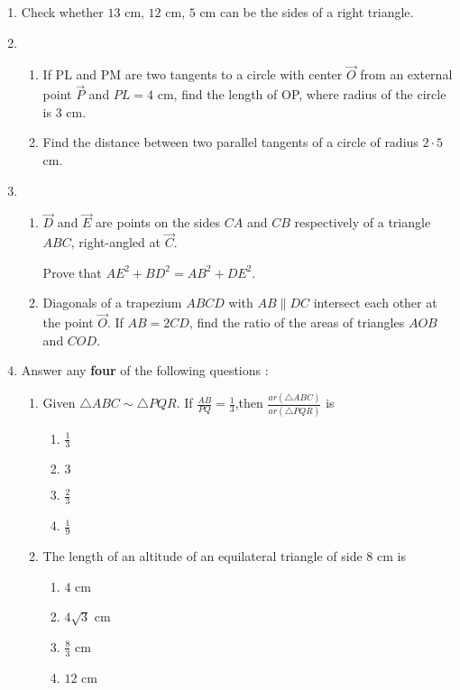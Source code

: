 \begin{enumerate}
\item Check whether $13$ cm, $12$ cm, $5$ cm can be the sides of a right triangle.
\item \begin{enumerate}
    \item If  PL and PM are two tangents to a circle with center $\vec{O}$ from an external point $\vec{P}$ and $PL=4$ cm, find the length of OP, where radius of the circle is $3$ cm.
    \item Find the distance between two parallel tangents of a circle of radius $2\cdot5$ cm.
\end{enumerate}
    \item 
    \begin{enumerate}
    \item $\vec{D}$ and $\vec{E}$ are points on the sides $CA$ and $CB$ respectively of  a triangle $ABC$, right-angled at $\vec{C}$.
    
    Prove that $AE^2+BD^2=AB^2+DE^2$.
    
    \item Diagonals of a trapezium $ABCD$ with $AB\parallel DC$ intersect each other at the point $\vec{O}$. If $AB=2CD$, find the ratio of the areas of triangles $AOB$ and $COD$.
    \end{enumerate}

    \item Answer any \textbf{four} of the following questions :
      \begin{enumerate}[label=(\roman*)]
        \item Given $\triangle ABC \sim \triangle PQR$. If $\frac{AB}{PQ}=\frac{1}{3}$,then $\frac{ar(\triangle ABC)}{ar(\triangle PQR)}$ is 
        \begin{enumerate}[label=(\Alph*)]
            \item $\frac{1}{3}$
            \item $3$
            \item $\frac{2}{3}$
            \item $\frac{1}{9}$
        \end{enumerate}
        
        \item The length of an altitude of an equilateral triangle of side $8$ cm is
        
          \begin{enumerate}[label=(\Alph*)]
            \item $4$ cm
            \item $4\sqrt{3}$ cm
            \item $\frac{8}{3}$ cm
            \item $12$ cm
        \end{enumerate}
        

\end{enumerate}
\end{enumerate}
